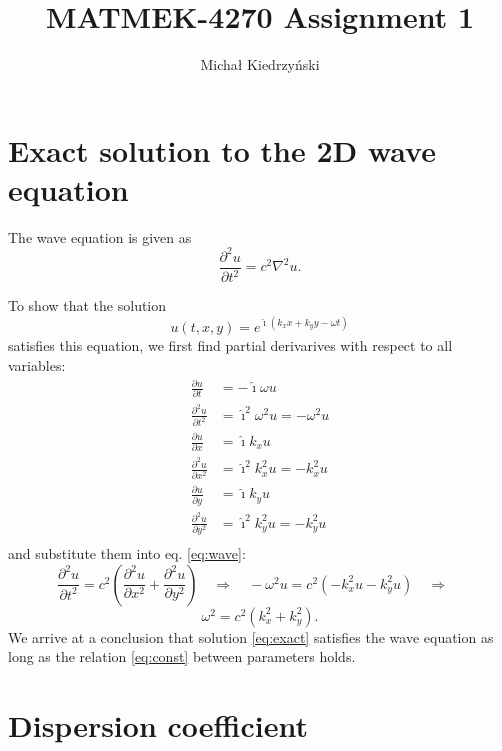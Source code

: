 \documentclass[english,notitlepage]{article}
\newcommand*{\ihat}{\hat{\imath}}
\begin{document}
\title{MATMEK-4270 Assignment 1}
\author{Michał Kiedrzyński}
\date{}
\maketitle 

\section{Exact solution to the 2D wave equation}
The wave equation is given as
\begin{equation}\label{eq:wave}
    \frac{\partial^2u}{\partial t^2} = c^2 \nabla^2u .
\end{equation}

To show that the solution
\begin{equation}\label{eq:exact}
    u(t,x,y) = e^{\ihat\left(k_xx+k_yy-\omega t\right)}
\end{equation}
satisfies this equation, we first find partial derivarives with respect to all variables:
\begin{align*}
    \frac{\partial u}{\partial t} &= -\ihat\omega u \\
    \frac{\partial^2 u}{\partial t^2} &= \ihat^2\omega^2 u = -\omega^2 u \\
    \frac{\partial u}{\partial x} &= \ihat k_x u \\
    \frac{\partial^2 u}{\partial x^2} &= \ihat^2 k_x^2 u = -k_x^2 u \\
    \frac{\partial u}{\partial y} &= \ihat k_y u \\
    \frac{\partial^2 u}{\partial y^2} &= \ihat^2 k_y^2 u = -k_y^2 u \\
\end{align*}
and substitute them into eq. \ref{eq:wave}:
\begin{equation*}
    \frac{\partial^2u}{\partial t^2} = c^2 \left(\frac{\partial^2u}{\partial x^2} + \frac{\partial^2u}{\partial y^2}\right) \quad \Rightarrow \quad -\omega^2 u = c^2 \left( -k_x^2 u -k_y^2 u\right) \quad \Rightarrow \quad 
\end{equation*}
\begin{equation}\label{eq:const}
    \omega^2 = c^2 \left( k_x^2 + k_y^2\right).
\end{equation}
We arrive at a conclusion that solution \ref{eq:exact} satisfies the wave equation as long as the relation \ref{eq:const} between parameters holds.

\section{Dispersion coefficient}
\end{document}
